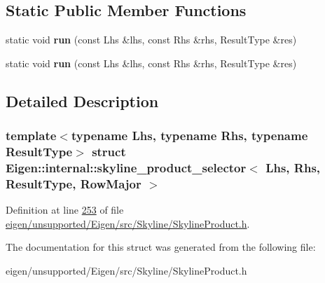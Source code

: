 \subsection*{Static Public Member Functions}
\begin{DoxyCompactItemize}
\item 
\mbox{\label{struct_eigen_1_1internal_1_1skyline__product__selector_3_01_lhs_00_01_rhs_00_01_result_type_00_01_row_major_01_4_a28327de600da831abbafc4f01493416f}} 
static void {\bfseries run} (const Lhs \&lhs, const Rhs \&rhs, Result\+Type \&res)
\item 
\mbox{\label{struct_eigen_1_1internal_1_1skyline__product__selector_3_01_lhs_00_01_rhs_00_01_result_type_00_01_row_major_01_4_a28327de600da831abbafc4f01493416f}} 
static void {\bfseries run} (const Lhs \&lhs, const Rhs \&rhs, Result\+Type \&res)
\end{DoxyCompactItemize}


\subsection{Detailed Description}
\subsubsection*{template$<$typename Lhs, typename Rhs, typename Result\+Type$>$\newline
struct Eigen\+::internal\+::skyline\+\_\+product\+\_\+selector$<$ Lhs, Rhs, Result\+Type, Row\+Major $>$}



Definition at line \hyperlink{eigen_2unsupported_2_eigen_2src_2_skyline_2_skyline_product_8h_source_l00253}{253} of file \hyperlink{eigen_2unsupported_2_eigen_2src_2_skyline_2_skyline_product_8h_source}{eigen/unsupported/\+Eigen/src/\+Skyline/\+Skyline\+Product.\+h}.



The documentation for this struct was generated from the following file\+:\begin{DoxyCompactItemize}
\item 
eigen/unsupported/\+Eigen/src/\+Skyline/\+Skyline\+Product.\+h\end{DoxyCompactItemize}
